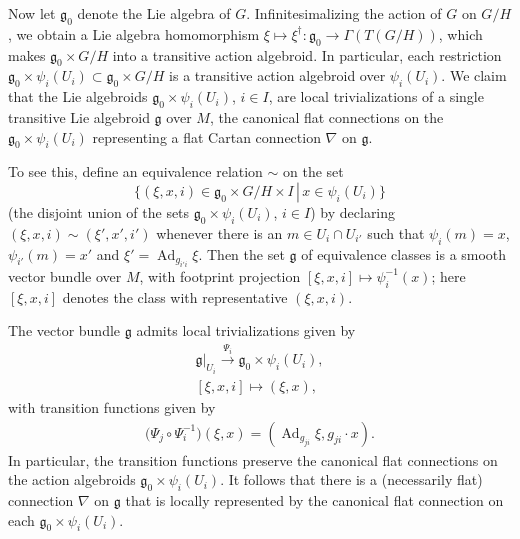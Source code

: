 \documentclass[11pt]{article}
\DeclareMathOperator{\Adjoint}{Ad}
\newcommand\suchthat{\,\left\vert\right.\, }
\numberwithin{equation}{section}
\begin{document}
Now let ${\mathfrak g}_0$ denote the Lie algebra of
$G$. Inf\/initesimalizing the action of $G$ on $G/H$, we obtain a Lie
algebra homomorphism $\xi \mapsto \xi^\dagger \colon {\mathfrak g}_0
\rightarrow \Gamma(T(G/H)) $, which makes ${\mathfrak g}_0 \times G/H$
into a transitive action algebroid. In particular, each restriction
${\mathfrak g}_0 \times \psi_i(U_i) \subset {\mathfrak g}_0 \times
G/H$ is a transitive action algebroid over $\psi_i(U_i)$. We claim
that the Lie algebroids ${\mathfrak g}_0 \times \psi_i(U_i) $, $i \in
I$, are local trivializations of a single transitive Lie algebroid
${\mathfrak g} $ over $M$, the canonical f\/lat connections on the
${\mathfrak g}_0 \times \psi_i(U_i)$ representing a f\/lat Cartan
connection $\nabla $ on $\mathfrak g$.

To see this, def\/ine an equivalence relation $\sim$ on the
set
\[
\{(\xi,x,i) \in {\mathfrak g}_0 \times G/H \times I\suchthat x
\in \psi_i(U_i)\}
\] (the disjoint union of the sets ${\mathfrak g}_0
\times \psi_i(U_i)$, $i\in I$) by declaring
$(\xi,x,i)\sim(\xi',x',i')$ whenever there is an $m\in U_i\cap U_{i'}$
such that $\psi_i(m)=x$, $\psi_{i'}(m)=x'$ and
$\xi'=\Adjoint_{g_{i'i}}\xi$. Then the set ${\mathfrak g}$ of
equivalence classes is a smooth vector bundle over $M$, with footprint
projection $[\xi,x,i]\mapsto \psi_i^{-1}(x)$; here $[\xi,x, i]$
denotes the class with representative $(\xi,x,i)$.

The vector bundle $\mathfrak g$ admits local trivializations given by
\begin{gather*}
  {\mathfrak g}|_{U_i} \xrightarrow{\Psi_i}{\mathfrak g}_0 \times \psi_i(U_i), \\
  [\xi,x,i] \mapsto (\xi,x),
\end{gather*}
with transition functions given by
\begin{gather*}
  \big(\Psi_j \circ
  \Psi_i^{-1}\big)(\xi,x)=(\Adjoint_{g_{ji}}\xi,g_{ji}\cdot x).%
\end{gather*}
In particular, the transition functions preserve the canonical f\/lat
connections on the action algebroids ${\mathfrak g}_0 \times
\psi_i(U_i)$. It follows that there is a (necessarily f\/lat) connection
$\nabla$ on $\mathfrak g$ that is locally represented by the canonical
f\/lat connection on each ${\mathfrak g}_0 \times \psi_i(U_i)$.
\end{document}
